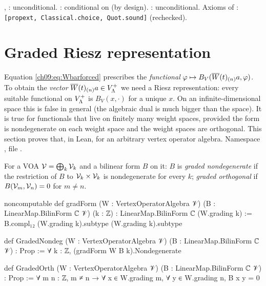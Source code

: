 \begin{status}
, : unconditional.
: conditional on  (by design).
: unconditional. Axioms of : \texttt{[propext,
Classical.choice, Quot.sound]} (rechecked).
\end{status}

\section{Graded Riesz representation}\label{ch09:sec:riesz}

Equation \eqref{ch09:eq:Wbarforced} prescribes the \emph{functional}
$\varphi\mapsto B_V(\overline{W}(t)_{(n)}a,\varphi)$. To obtain the \emph{vector}
$\overline{W}(t)_{(n)}a\in V_{\Lambda}^{+}$ we need a Riesz representation: every suitable functional on
$V_{\Lambda}^{+}$ is $B_V(x,\cdot)$ for a unique $x$. On an infinite-dimensional space this is false in
general (the algebraic dual is much bigger than the space). It is true for functionals that live on
finitely many weight spaces, provided the form is nondegenerate on each weight space and the weight
spaces are orthogonal. This section proves that, in Lean, for an arbitrary vertex operator algebra.
Namespace , file .

\begin{definition}\label{ch09:def:graded}
For a VOA $\mathcal{V}=\bigoplus_k\mathcal{V}_k$ and a bilinear form $B$ on it: $B$ is \emph{graded
nondegenerate} if the restriction of $B$ to $\mathcal{V}_k\times\mathcal{V}_k$ is nondegenerate for every
$k$; \emph{graded orthogonal} if $B(\mathcal{V}_m,\mathcal{V}_n)=0$ for $m\neq n$.
\end{definition}
\begin{leancode}
noncomputable def gradForm (W : VertexOperatorAlgebra 𝒱) (B : LinearMap.BilinForm ℂ 𝒱) (k : ℤ) :
    LinearMap.BilinForm ℂ (W.grading k) :=
  B.compl₁₂ (W.grading k).subtype (W.grading k).subtype

def GradedNondeg (W : VertexOperatorAlgebra 𝒱) (B : LinearMap.BilinForm ℂ 𝒱) : Prop :=
  ∀ k : ℤ, (gradForm W B k).Nondegenerate

def GradedOrth (W : VertexOperatorAlgebra 𝒱) (B : LinearMap.BilinForm ℂ 𝒱) : Prop :=
  ∀ m n : ℤ, m ≠ n → ∀ x ∈ W.grading m, ∀ y ∈ W.grading n, B x y = 0
\end{leancode}

